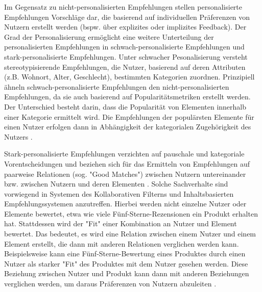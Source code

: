 Im Gegensatz zu nicht-personalisierten Empfehlungen stellen personalisierte Empfehlungen Vorschläge dar, die basierend auf individuellen Präferenzen von Nutzern erstellt werden (bspw. über explizites oder implizites Feedback).
Der Grad der Personalisierung ermöglicht eine weitere Unterteilung der personalisierten Empfehlungen in schwach-personalisierte Empfehlungen und stark-personalisierte Empfehlungen.
Unter schwacher Pesonalisierung versteht \textcite[S. 407]{unternährer:article} stereotypisierende Empfehlungen, die Nutzer, basierend auf deren Attributen (z.B. Wohnort, Alter, Geschlecht), bestimmten Kategorien zuordnen.
Prinzipiell ähneln schwach-personalisierte Empfehlungen den nicht-personalisierten Empfehlungen, da sie auch basierend auf Popularitätsmetriken erstellt werden.
Der Unterschied besteht darin, dass die Popularität von Elementen innerhalb einer Kategorie ermittelt wird.
Die Empfehlungen der populärsten Elemente für einen Nutzer erfolgen dann in Abhängigkeit der kategorialen Zugehörigkeit des Nutzers \cite[S. 407ff]{unternährer:article}.

Stark-personalisierte Empfehlungen verzichten auf pauschale und kategoriale Vorentscheidungen und beziehen sich für das Ermitteln von Empfehlungen auf paarweise Relationen (sog. "Good Matches") zwischen Nutzern untereinander bzw. zwischen Nutzern und deren Elementen \cite[S. 415]{unternährer:article}.
Solche Sachverhalte sind vorwiegend in Systemen des Kollaborativen Filterns und Inhaltsbasierten Empfehlungssystemen anzutreffen.
Hierbei werden nicht einzelne Nutzer oder Elemente bewertet, etwa wie viele Fünf-Sterne-Rezensionen ein Produkt erhalten hat. 
Stattdessen wird der "Fit" einer Kombination an Nutzer und Element bewertet.
Das bedeutet, es wird eine Relation zwischen einem  Nutzer und einem Element erstellt, die dann mit anderen Relationen verglichen werden kann.
Beispielsweise kann eine Fünf-Sterne-Bewertung eines Produktes durch einen Nutzer als starker "Fit" des Produktes mit dem Nutzer gesehen werden.
Diese Beziehung zwischen Nutzer und Produkt kann dann mit anderen Beziehungen verglichen werden, um daraus Präferenzen von Nutzern abzuleiten \cite[S. 417]{unternährer:article}.

